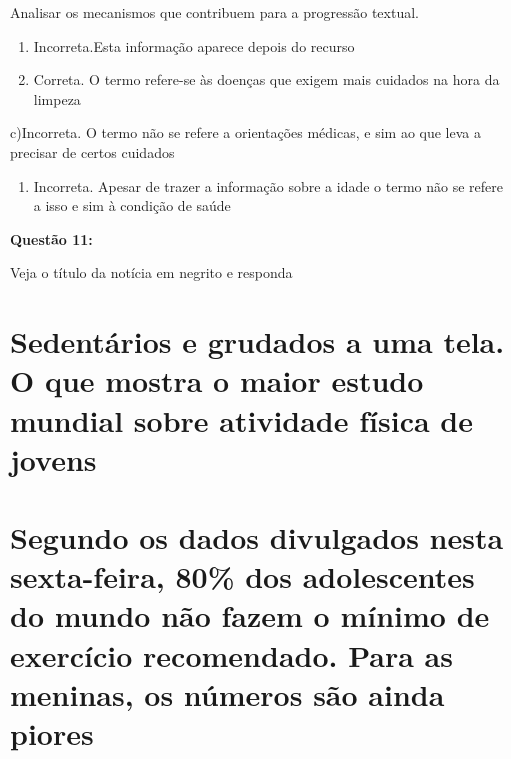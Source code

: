 {Analisar os mecanismos que contribuem para a progressão textual.

\begin{enumerate}
\def\labelenumi{\arabic{enumi}.}
\item
  Incorreta.Esta informação aparece depois do recurso
\item
  Correta. O termo refere-se às doenças que exigem mais cuidados na hora
  da limpeza
\end{enumerate}

c)Incorreta. O termo não se refere a orientações médicas, e sim ao que
leva a precisar de certos cuidados

\begin{enumerate}
\def\labelenumi{\arabic{enumi}.}
\tightlist
\item
  Incorreta. Apesar de trazer a informação sobre a idade o termo não se
  refere a isso e sim à condição de saúde
\end{enumerate}

\textbf{Questão 11:}

Veja o título da notícia em negrito e responda

\hypertarget{sedentuxe1rios-e-grudados-a-uma-tela.-o-que-mostra-o-maior-estudo-mundial-sobre-atividade-fuxedsica-de-jovens}{%
\section{\texorpdfstring{\textbf{Sedentários e grudados a uma tela. O
que mostra o maior estudo mundial sobre atividade física de
jovens}}{Sedentários e grudados a uma tela. O que mostra o maior estudo mundial sobre atividade física de jovens}}\label{sedentuxe1rios-e-grudados-a-uma-tela.-o-que-mostra-o-maior-estudo-mundial-sobre-atividade-fuxedsica-de-jovens}}

\hypertarget{segundo-os-dados-divulgados-nesta-sexta-feira-80-dos-adolescentes-do-mundo-nuxe3o-fazem-o-muxednimo-de-exercuxedcio-recomendado.-para-as-meninas-os-nuxfameros-suxe3o-ainda-piores}{%
\section{Segundo os dados divulgados nesta sexta-feira, 80\% dos
adolescentes do mundo não fazem o mínimo de exercício recomendado. Para
as meninas, os números são ainda
piores}\label{segundo-os-dados-divulgados-nesta-sexta-feira-80-dos-adolescentes-do-mundo-nuxe3o-fazem-o-muxednimo-de-exercuxedcio-recomendado.-para-as-meninas-os-nuxfameros-suxe3o-ainda-piores}}

}
